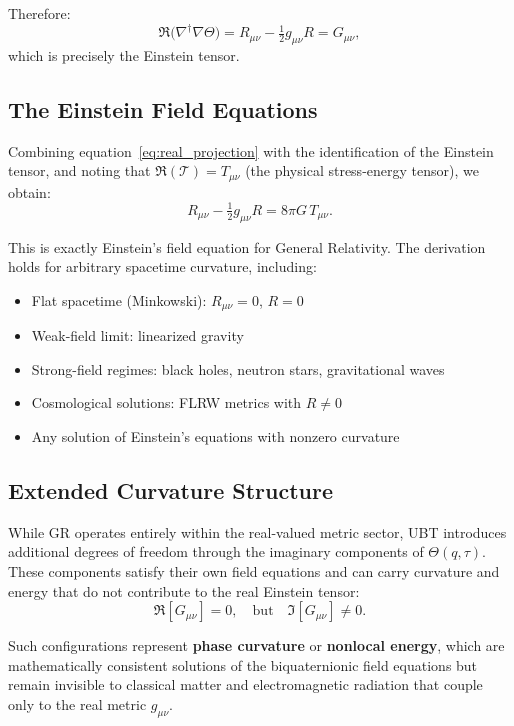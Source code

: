 Therefore:
\begin{equation}
\Re\big(\nabla^\dagger \nabla \Theta\big) = R_{\mu\nu} - \tfrac{1}{2} g_{\mu\nu} R = G_{\mu\nu},
\end{equation}
which is precisely the Einstein tensor.

\subsection{The Einstein Field Equations}

Combining equation~\eqref{eq:real_projection} with the identification of the Einstein tensor, and noting that $\Re(\mathcal{T}) = T_{\mu\nu}$ (the physical stress-energy tensor), we obtain:
\begin{equation}
R_{\mu\nu} - \tfrac{1}{2} g_{\mu\nu} R = 8 \pi G \, T_{\mu\nu}.
\label{eq:einstein_equations}
\end{equation}

This is exactly Einstein's field equation for General Relativity. The derivation holds for arbitrary spacetime curvature, including:
\begin{itemize}
  \item Flat spacetime (Minkowski): $R_{\mu\nu} = 0$, $R = 0$
  \item Weak-field limit: linearized gravity
  \item Strong-field regimes: black holes, neutron stars, gravitational waves
  \item Cosmological solutions: FLRW metrics with $R \neq 0$
  \item Any solution of Einstein's equations with nonzero curvature
\end{itemize}

\subsection{Extended Curvature Structure}

While GR operates entirely within the real-valued metric sector, UBT introduces additional degrees of freedom through the imaginary components of $\Theta(q,\tau)$. These components satisfy their own field equations and can carry curvature and energy that do not contribute to the real Einstein tensor:
\begin{equation}
\Re[G_{\mu\nu}] = 0, \quad \text{but} \quad \Im[G_{\mu\nu}] \neq 0.
\end{equation}

Such configurations represent \textbf{phase curvature} or \textbf{nonlocal energy}, which are mathematically consistent solutions of the biquaternionic field equations but remain invisible to classical matter and electromagnetic radiation that couple only to the real metric $g_{\mu\nu}$.

